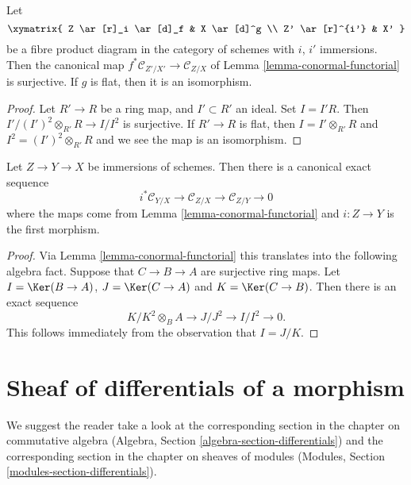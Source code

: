 \begin{lemma}
\label{lemma-conormal-functorial-flat}
Let
$$
\xymatrix{
Z \ar[r]_i \ar[d]_f & X \ar[d]^g \\
Z' \ar[r]^{i'} & X'
}
$$
be a fibre product diagram in the category of schemes with
$i$, $i'$ immersions. Then the canonical map
$f^*\mathcal{C}_{Z'/X'} \to \mathcal{C}_{Z/X}$ of
Lemma \ref{lemma-conormal-functorial}
is surjective. If $g$ is flat, then it is an isomorphism.
\end{lemma}

\begin{proof}
Let $R' \to R$ be a ring map, and $I' \subset R'$ an ideal.
Set $I = I'R$. Then $I'/(I')^2 \otimes_{R'} R \to I/I^2$ is
surjective. If $R' \to R$ is flat, then $I = I' \otimes_{R'} R$
and $I^2 = (I')^2 \otimes_{R'} R$ and we see the map is an
isomorphism.
\end{proof}

\begin{lemma}
\label{lemma-transitivity-conormal}
Let $Z \to Y \to X$ be immersions of schemes. Then there is a canonical
exact sequence
$$
i^*\mathcal{C}_{Y/X} \to
\mathcal{C}_{Z/X} \to
\mathcal{C}_{Z/Y} \to 0
$$
where the maps come from
Lemma \ref{lemma-conormal-functorial}
and $i : Z \to Y$ is the first morphism.
\end{lemma}

\begin{proof}
Via
Lemma \ref{lemma-conormal-functorial}
this translates into the following algebra fact. Suppose that
$C \to B \to A$ are surjective ring maps. Let $I = \Ker(B \to A)$,
$J = \Ker(C \to A)$ and $K = \Ker(C \to B)$. Then
there is an exact sequence
$$
K/K^2 \otimes_B A \to J/J^2 \to I/I^2 \to 0.
$$
This follows immediately from the observation that $I = J/K$.
\end{proof}










\section{Sheaf of differentials of a morphism}
\label{section-sheaf-differentials}

\noindent
We suggest the reader take a look at the corresponding section
in the chapter on commutative algebra
(Algebra, Section \ref{algebra-section-differentials})
and the corresponding section in the chapter on sheaves of modules
(Modules, Section \ref{modules-section-differentials}).

